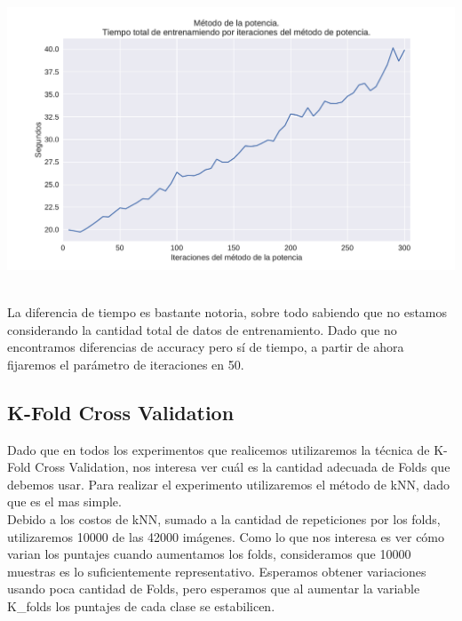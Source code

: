 {\centering
    \includegraphics[scale=0.55]{informe/imagenes/potencia/tiempoPorIters.pdf} \\
}
$ $\newline

La diferencia de tiempo es bastante notoria, sobre todo sabiendo que no estamos considerando la cantidad total de datos de entrenamiento. Dado que no encontramos diferencias de accuracy pero sí de tiempo, a partir de ahora fijaremos el parámetro de iteraciones en 50. \\

\newpage
\subsection{K-Fold Cross Validation}

Dado que en todos los experimentos que realicemos utilizaremos la técnica de K-Fold Cross Validation, nos interesa ver cuál es la cantidad adecuada de Folds que debemos usar. Para realizar el experimento utilizaremos el método de kNN, dado que es el mas simple. \\

Debido a los costos de kNN, sumado a la cantidad de repeticiones por los folds, utilizaremos 10000 de las 42000 imágenes. Como lo que nos interesa es ver cómo varian los puntajes cuando aumentamos los folds, consideramos que 10000 muestras es lo suficientemente representativo. Esperamos obtener variaciones usando poca cantidad de Folds, pero esperamos que al aumentar la variable K_folds los puntajes de cada clase se estabilicen. \\


